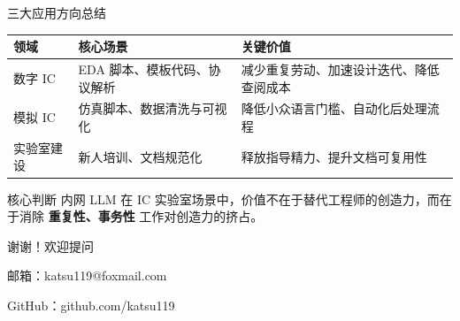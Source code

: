 \documentclass[aspectratio=169, 10pt, UTF8]{ctexbeamer}
\begin{document}
\begin{frame}{三大应用方向总结}
  \begin{table}
    \centering
    \begin{tabular}{l p{35mm} p{55mm}}
      \toprule
      领域 & 核心场景 & 关键价值 \\
      \midrule
      数字 IC
        & EDA 脚本、模板代码、协议解析
        & 减少重复劳动、加速设计迭代、降低查阅成本 \\
      \midrule
      模拟 IC
        & 仿真脚本、数据清洗与可视化
        & 降低小众语言门槛、自动化后处理流程 \\
      \midrule
      实验室建设
        & 新人培训、文档规范化
        & 释放指导精力、提升文档可复用性 \\
      \bottomrule
    \end{tabular}
  \end{table}

  \vspace{8pt}
  \begin{exampleblock}{核心判断}
    内网 LLM 在 IC 实验室场景中，价值不在于替代工程师的创造力，而在于消除 \textbf{重复性、事务性} 工作对创造力的挤占。
  \end{exampleblock}
\end{frame}

\begin{frame}[plain]
  \centering
  \vfill
  {\huge\color{ieeeBlue} 谢谢！欢迎提问}

  \vspace{20pt}
  {\large 邮箱：katsu119@foxmail.com}

  \vspace{8pt}
  {\large GitHub：github.com/katsu119}
  \vfill
\end{frame}
\end{document}
